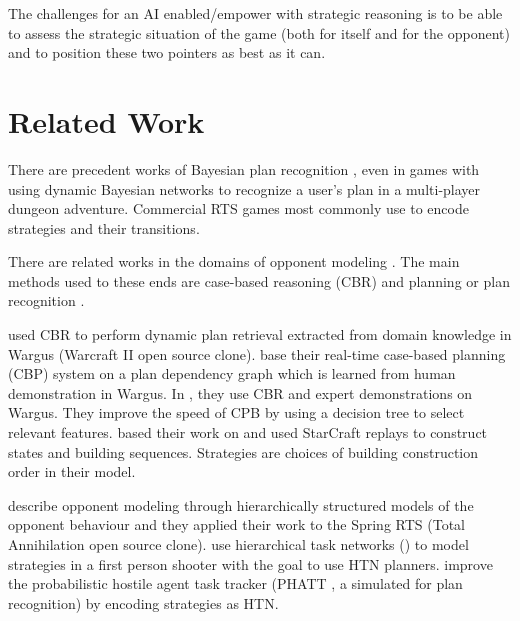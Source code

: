 The challenges for an AI enabled/empower with strategic reasoning is to be able to assess the strategic situation of the game (both for itself and for the opponent) and to position these two pointers as best as it can.

\section{Related Work}


There are precedent works of Bayesian plan recognition \citep{BMPR}, even in games with \citep{BayesianRecog} using dynamic Bayesian networks to recognize a user's plan in a multi-player dungeon adventure. Commercial RTS games most commonly use  \citep{FSM_AIGameProgWisdom2003} to encode strategies and their transitions.

There are related works in the domains of opponent modeling \citep{HsiehS08,schadd2007opponent,Kabanza2010}. The main methods used to these ends are case-based reasoning (CBR) and planning or plan recognition \citep{LTW,CBR_Planning,OntanonCBR,HTNPlanning,Ramirez}.

\cite{LTW} used CBR to perform dynamic plan retrieval extracted from domain knowledge in Wargus (Warcraft II open source clone). \cite{CBR_Planning} base their real-time case-based planning (CBP) system on a plan dependency graph which is learned from human demonstration in Wargus. In \citep{OntanonCBR,PlanRetrieval}, they use CBR and expert demonstrations on Wargus. %
They improve the speed of CPB by using a decision tree to select relevant features. \cite{HsiehS08} based their work on \citep{LTW} and used StarCraft replays to construct states and building sequences. Strategies are choices of building construction order in their model. 

\cite{schadd2007opponent} describe opponent modeling through hierarchically structured models of the opponent behaviour and they applied their work to the Spring RTS (Total Annihilation open source clone). \cite{HTNPlanning} use hierarchical task networks () to model strategies in a first person shooter with the goal to use HTN planners. \cite{Kabanza2010} improve the probabilistic hostile agent task tracker (PHATT \citep{PHATT}, a simulated  for plan recognition) by encoding strategies as HTN. 

